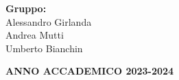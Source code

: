 \begin{titlepage}
\begin{center}
            \LARGE
            \textbf{\@title}
    
            \large
            \begin{flushright}
                \textbf{Gruppo:} \\ Alessandro Girlanda \\  Andrea Mutti \\  Umberto Bianchin \\
            \end{flushright}
    
            \textbf{ANNO ACCADEMICO 2023-2024}
        
            \makeatother %
        \end{center}
    \restoregeometry
\end{titlepage}
